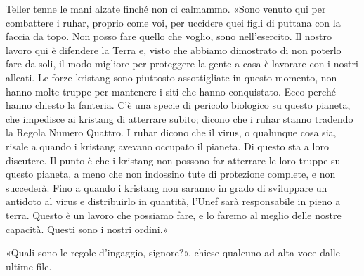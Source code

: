 Teller tenne le mani alzate finché non ci calmammo. «Sono venuto qui per
combattere i ruhar, proprio come voi, per uccidere quei figli di puttana
con la faccia da topo. Non posso fare quello che voglio, sono
nell'esercito. Il nostro lavoro qui è difendere la Terra e, visto che
abbiamo dimostrato di non poterlo fare da soli, il modo migliore per
proteggere la gente a casa è lavorare con i nostri alleati. Le forze
kristang sono piuttosto assottigliate in questo momento, non hanno molte
truppe per mantenere i siti che hanno conquistato. Ecco perché hanno
chiesto la fanteria. C'è una specie di pericolo biologico su questo
pianeta, che impedisce ai kristang di atterrare subito; dicono che i
ruhar stanno tradendo la Regola Numero Quattro. I ruhar dicono che il
virus, o qualunque cosa sia, risale a quando i kristang avevano occupato
il pianeta. Di questo sta a loro discutere. Il punto è che i kristang
non possono far atterrare le loro truppe su questo pianeta, a meno che
non indossino tute di protezione complete, e non succederà. Fino a
quando i kristang non saranno in grado di sviluppare un antidoto al
virus e distribuirlo in quantità, l'Unef sarà responsabile in pieno a
terra. Questo è un lavoro che possiamo fare, e lo faremo al meglio delle
nostre capacità. Questi sono i nostri ordini.»

«Quali sono le regole d'ingaggio, signore?», chiese qualcuno ad alta
voce dalle ultime file.

